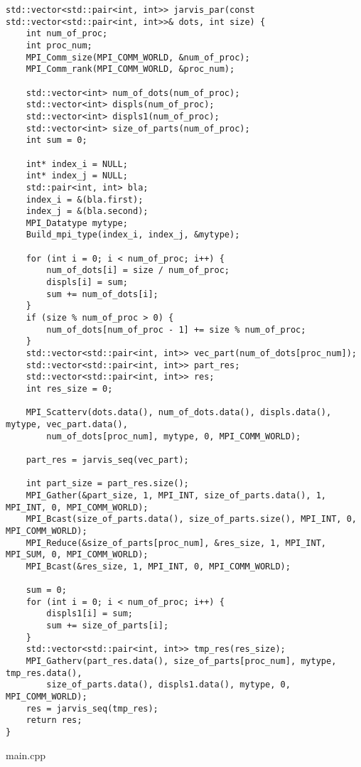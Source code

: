 \documentclass{report}
\begin{document}
\begin{lstlisting}
std::vector<std::pair<int, int>> jarvis_par(const std::vector<std::pair<int, int>>& dots, int size) {
    int num_of_proc;
    int proc_num;
    MPI_Comm_size(MPI_COMM_WORLD, &num_of_proc);
    MPI_Comm_rank(MPI_COMM_WORLD, &proc_num);

    std::vector<int> num_of_dots(num_of_proc);
    std::vector<int> displs(num_of_proc);
    std::vector<int> displs1(num_of_proc);
    std::vector<int> size_of_parts(num_of_proc);
    int sum = 0;

    int* index_i = NULL;
    int* index_j = NULL;
    std::pair<int, int> bla;
    index_i = &(bla.first);
    index_j = &(bla.second);
    MPI_Datatype mytype;
    Build_mpi_type(index_i, index_j, &mytype);

    for (int i = 0; i < num_of_proc; i++) {
        num_of_dots[i] = size / num_of_proc;
        displs[i] = sum;
        sum += num_of_dots[i];
    }
    if (size % num_of_proc > 0) {
        num_of_dots[num_of_proc - 1] += size % num_of_proc;
    }
    std::vector<std::pair<int, int>> vec_part(num_of_dots[proc_num]);
    std::vector<std::pair<int, int>> part_res;
    std::vector<std::pair<int, int>> res;
    int res_size = 0;

    MPI_Scatterv(dots.data(), num_of_dots.data(), displs.data(), mytype, vec_part.data(),
        num_of_dots[proc_num], mytype, 0, MPI_COMM_WORLD);

    part_res = jarvis_seq(vec_part);

    int part_size = part_res.size();
    MPI_Gather(&part_size, 1, MPI_INT, size_of_parts.data(), 1, MPI_INT, 0, MPI_COMM_WORLD);
    MPI_Bcast(size_of_parts.data(), size_of_parts.size(), MPI_INT, 0, MPI_COMM_WORLD);
    MPI_Reduce(&size_of_parts[proc_num], &res_size, 1, MPI_INT, MPI_SUM, 0, MPI_COMM_WORLD);
    MPI_Bcast(&res_size, 1, MPI_INT, 0, MPI_COMM_WORLD);

    sum = 0;
    for (int i = 0; i < num_of_proc; i++) {
        displs1[i] = sum;
        sum += size_of_parts[i];
    }
    std::vector<std::pair<int, int>> tmp_res(res_size);
    MPI_Gatherv(part_res.data(), size_of_parts[proc_num], mytype, tmp_res.data(),
        size_of_parts.data(), displs1.data(), mytype, 0, MPI_COMM_WORLD);
    res = jarvis_seq(tmp_res);
    return res;
}
\end{lstlisting}
main.cpp
\end{document}
